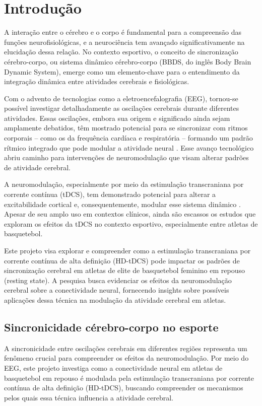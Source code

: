 \chapter{Introdução}
\label{chap:introducao}

A interação entre o cérebro e o corpo é fundamental para a compreensão das funções neurofisiológicas, e a neurociência tem avançado significativamente na elucidação dessa relação. No contexto esportivo, o conceito de sincronização cérebro-corpo, ou sistema dinâmico cérebro-corpo (BBDS, do inglês Body Brain Dynamic System), emerge como um elemento-chave para o entendimento da integração dinâmica entre atividades cerebrais e fisiológicas. 

Com o advento de tecnologias como a eletroencefalografia (EEG), tornou-se possível investigar detalhadamente as oscilações cerebrais durante diferentes atividades. Essas oscilações, embora sua origem e significado ainda sejam amplamente debatidos, têm mostrado potencial para se sincronizar com ritmos corporais – como os da frequência cardíaca e respiratória – formando um padrão rítmico integrado que pode modular a atividade neural \cite{criscuolo2022cognition, cohen2017where}. Esse avanço tecnológico abriu caminho para intervenções de neuromodulação que visam alterar padrões de atividade cerebral.

A neuromodulação, especialmente por meio da estimulação transcraniana por corrente contínua (tDCS), tem demonstrado potencial para alterar a excitabilidade cortical e, consequentemente, modular esse sistema dinâmico \cite{nitsche2000excitability, stagg2011physiological}. Apesar de seu amplo uso em contextos clínicos, ainda são escassos os estudos que exploram os efeitos da tDCS no contexto esportivo, especialmente entre atletas de basquetebol.

Este projeto visa explorar e compreender como a estimulação transcraniana por corrente contínua de alta definição (HD-tDCS) pode impactar os padrões de sincronização cerebral em atletas de elite de basquetebol feminino em repouso (resting state). A pesquisa busca evidenciar os efeitos da neuromodulação cerebral sobre a conectividade neural, fornecendo insights sobre possíveis aplicações dessa técnica na modulação da atividade cerebral em atletas.

\section{Sincronicidade cérebro-corpo no esporte}  
A sincronicidade entre oscilações cerebrais em diferentes regiões representa um fenômeno crucial para compreender os efeitos da neuromodulação. Por meio do EEG, este projeto investiga como a conectividade neural em atletas de basquetebol em repouso é modulada pela estimulação transcraniana por corrente contínua de alta definição (HD-tDCS), buscando compreender os mecanismos pelos quais essa técnica influencia a atividade cerebral.

